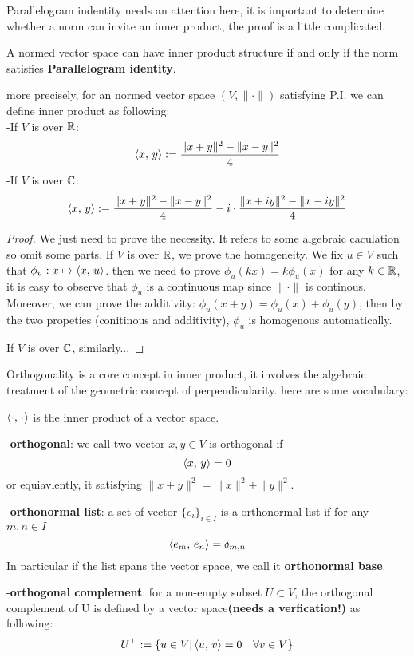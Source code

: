 \documentclass[en,geye,blue,normal,12pt,bibend=bibtex]{elegantnote}
\begin{document}
Parallelogram indentity needs an attention here, it is important to determine whether a norm can invite an inner product, the proof is a little complicated.

\begin{theorem}
    A normed vector space can have inner product structure if and only if the norm satisfies \textbf{Parallelogram identity}. 

    more precisely, for an normed vector space \((V,\|\cdot\|)\) satisfying P.I. we can define inner product as following:\\
    -If \(V\) is over \(\mathbb{R}\):
    \[\left\langle x,\, y \right\rangle := \frac{\|x+y\|^2-\|x-y\|^2}{4}\]
    -If \(V\) is over \(\mathbb{C}\):
    \[\left\langle x,\, y \right\rangle := \frac{\|x+y\|^2-\|x-y\|^2}{4}-i\cdot \frac{\|x+iy\|^2-\|x-iy\|^2}{4}\]

    \begin{proof}
        We just need to prove the necessity. It refers to some algebraic caculation so omit some parts. If \(V\) is over \(\mathbb{R}\), we prove the homogeneity. We fix \(u \in V\) such that \(\phi_u: x \mapsto \left\langle x,\, u \right\rangle\). then we need to prove \(\phi_u(kx)=k\phi_u(x)\) for any \(k \in \mathbb{R}\), it is easy to observe that \(\phi_u\) is a continuous map since \(\|\cdot\|\) is continous. Moreover, we can prove the additivity: \(\phi_u(x+y)=\phi_u(x)+\phi_u(y)\), then by the two propeties (conitinous and additivity), \(\phi_u\)  is homogenous automatically.

        If \(V\) is over \(\mathbb{C}\), similarly...
    \end{proof}
\end{theorem}

Orthogonality is a core concept in inner product, it involves the algebraic treatment of the geometric concept of perpendicularity. here are some vocabulary:

\begin{definition}
    \(\left\langle \cdot,\, \cdot \right\rangle\) is the inner product of a vector space.


    -\textbf{orthogonal}: we call two vector \(x,y \in V\) is orthogonal if 
    \[\left\langle x,\, y \right\rangle=0\]
    or equiavlently, it satisfying \(\|x+y\|^2=\|x\|^2+\|y\|^2\).


    -\textbf{orthonormal list}: a set of vector \(\{e_i\}_{i \in I}\) is a orthonormal list if for any \(m,n \in I\)
    \[\left\langle e_m,\, e_n \right\rangle = \delta_{m,n}\]
    In particular if the list spans the vector space, we call it \textbf{orthonormal base}.

    -\textbf{orthogonal complement}: for a non-empty subset \(U \subset V\), the orthogonal complement of U is defined by a vector space\textbf{(needs a verfication!)} as following:
    \[U^\perp := \{u\in V |\left\langle u,\, v \right\rangle=0 \quad \forall v \in V \}\]
\end{definition}
\end{document}

